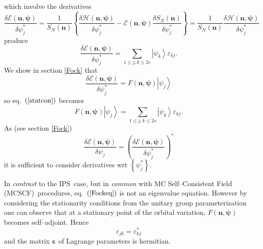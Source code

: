 \documentclass[aps,preprint]{revtex4}%
\begin{document}
which involve the derivatives
\begin{equation}
\frac{\delta\mathcal{E}\left(  \mathbf{n,\psi}\right)  }{\delta\psi_{j}^{\ast
}}=\frac{1}{S_{N}\left(  \mathbf{n}\right)  }\left\{  \frac{\delta
\mathcal{H}\left(  \mathbf{n,\psi}\right)  }{\delta\psi_{j}^{\ast}%
}-\mathcal{E}\left(  \mathbf{n,\psi}\right)  \frac{\delta S_{N}\left(
\mathbf{n}\right)  }{\delta\psi_{j}^{\ast}}\right\}  =\frac{1}{S_{N}\left(
\mathbf{n}\right)  }\frac{\delta\mathcal{H}\left(  \mathbf{n,\psi}\right)
}{\delta\psi_{j}^{\ast}}%
\end{equation}
produce
\begin{equation}
\frac{\delta\mathcal{E}\left(  \mathbf{n,\psi}\right)  }{\delta\psi_{j}^{\ast
}}=\sum_{1\leq j,k\leq2s}\left\vert \psi_{k}\right\rangle \varepsilon_{kj}.
\label{statcon}%
\end{equation}
We show in section \ref{Fock} that
\begin{equation}
\frac{\delta\mathcal{E}\left(  \mathbf{n,\psi}\right)  }{\delta\psi_{j}^{\ast
}}=F\left(  \mathbf{n,\psi}\right)  \left\vert \psi_{j}\right\rangle
\end{equation}
so eq.\ $\left(  \ref{statcon}\right)  $ becomes
\begin{equation}
F\left(  \mathbf{n,\psi}\right)  \left\vert \psi_{j}\right\rangle =\sum_{1\leq
j,k\leq2s}\left\vert \psi_{k}\right\rangle \varepsilon_{kj}. \label{Fockeq}%
\end{equation}
As (see section \ref{Fock})%
\begin{equation}
\frac{\delta\mathcal{E}\left(  \mathbf{n,\psi}\right)  }{\delta\psi_{j}%
}=\left(  \frac{\delta\mathcal{E}\left(  \mathbf{n,\psi}\right)  }{\delta
\psi_{j}^{\ast}}\right)  ^{\ast}%
\end{equation}
it is sufficient to consider derivatives wrt $\left\{  \psi_{j}^{\ast
}\right\}  $.

In \emph{contrast} to the IPS\ case, but in \emph{common} with MC
Self--Consistent Field (MCSCF)\ procedures, eq.\ $\left(  \ref{Fockeq}\right)
$ is not an eigenvalue equation. However by considering the stationarity
conditions from the unitary group parameterization one can observe that at a
stationary point of the orbital variation, $F\left(  \mathbf{n,\psi}\right)  $
becomes self--adjoint. Hence
\begin{equation}
\varepsilon_{jk}=\varepsilon_{kj}^{\ast}%
\end{equation}
and the matrix $\mathbf{\varepsilon}$ of Lagrange parameters is hermitian.
\end{document}
